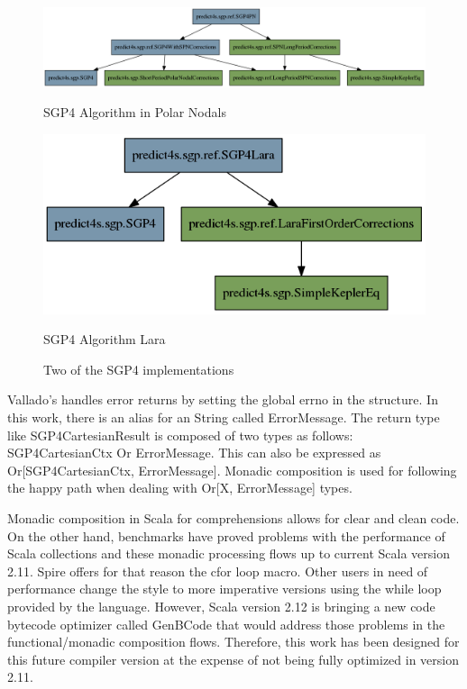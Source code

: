 \documentclass{article}
\begin{document}
\begin{figure}[htb]
\begin{minipage}[b]{.48\linewidth}
  \centering
	\includegraphics[width=\linewidth]{pn.png}
  \centerline{SGP4 Algorithm in Polar Nodals}\medskip
\end{minipage}
\hfill
\begin{minipage}[b]{0.48\linewidth}
  \centering
	\includegraphics[width=\linewidth]{lara.png}
  \centerline{SGP4 Algorithm Lara}\medskip
\end{minipage}
\caption{Two of the SGP4 implementations}
\label{fig:res}
\end{figure}

Vallado's handles error returns by setting the global errno in the
structure. In this work, there is an alias for an String called ErrorMessage.
The return type like SGP4CartesianResult is composed of
two types as follows: SGP4CartesianCtx Or ErrorMessage. This can also be expressed
as Or[SGP4CartesianCtx, ErrorMessage]. Monadic composition is used for following the
happy path when dealing with Or[X, ErrorMessage] types.

Monadic composition in Scala for comprehensions allows for clear and clean code.
On the other hand, benchmarks have proved problems with the performance
of Scala collections and these monadic processing flows up to current Scala
version 2.11. Spire offers for
that reason the cfor loop macro. Other users in need of performance change the
style to more imperative versions using the while loop provided by the language.
However, Scala version 2.12 is bringing a new code bytecode optimizer called GenBCode
that would address those problems in the functional/monadic composition flows.
Therefore, this work has been designed for this future compiler version at the expense
of not being fully optimized in version 2.11.
\end{document}
